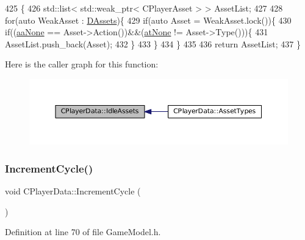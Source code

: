 \begin{DoxyCode}
425                                                                     \{
426     std::list< std::weak\_ptr< CPlayerAsset > > AssetList;
427     
428     \textcolor{keywordflow}{for}(\textcolor{keyword}{auto} WeakAsset : \hyperlink{classCPlayerData_a1d7dd355facf52db6242e3554373906c}{DAssets})\{
429         \textcolor{keywordflow}{if}(\textcolor{keyword}{auto} Asset = WeakAsset.lock())\{
430             \textcolor{keywordflow}{if}((\hyperlink{GameDataTypes_8h_ab47668e651a3032cfb9c40ea2d60d670ac17cc5a0035320c060d7f8074143b507}{aaNone} == Asset->Action())&&(\hyperlink{GameDataTypes_8h_a5600d4fc433b83300308921974477feca82fb51718e2c00981a2d37bc6fe92593}{atNone} != Asset->Type()))\{
431                 AssetList.push\_back(Asset);
432             \}
433         \}
434     \}
435     
436     \textcolor{keywordflow}{return} AssetList;
437 \}
\end{DoxyCode}
Here is the caller graph for this function\+:
\nopagebreak
\begin{figure}[H]
\begin{center}
\leavevmode
\includegraphics[width=350pt]{classCPlayerData_a5bd2ebe2e3dc25669bb312226e087fd1_icgraph}
\end{center}
\end{figure}
\hypertarget{classCPlayerData_a6fbfd47b568e721df80644689f8dd172}{}\label{classCPlayerData_a6fbfd47b568e721df80644689f8dd172} 
\subsubsection{\texorpdfstring{Increment\+Cycle()}{IncrementCycle()}}
{\footnotesize\ttfamily void C\+Player\+Data\+::\+Increment\+Cycle (\begin{DoxyParamCaption}{ }\end{DoxyParamCaption})\hspace{0.3cm}{\ttfamily [inline]}}



Definition at line 70 of file Game\+Model.\+h.


